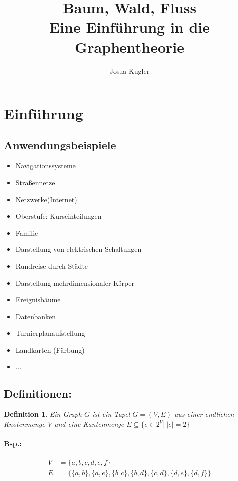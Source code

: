 \documentclass[12pt]{article}
\title{Baum, Wald, Fluss\\
	Eine Einführung in die Graphentheorie}
\author{Josua Kugler}
\numberwithin{equation}{subsection}
\newtheorem{df}{Definition}
\begin{document}
	\maketitle
	\tableofcontents
	\pagebreak
	\section{Einführung}
	\subsection{Anwendungsbeispiele}
	\begin{itemize}
		\item Navigationssysteme
		\item Straßennetze
		\item Netzwerke(Internet)
		\item Oberstufe: Kurseinteilungen
		\item Familie
		\item Darstellung von elektrischen Schaltungen
		\item Rundreise durch Städte
		\item Darstellung mehrdimensionaler Körper
		\item Ereignisbäume
		\item Datenbanken
		\item Turnierplanaufstellung
		\item Landkarten (Färbung)
		\item ...
	\end{itemize}
	\subsection{Definitionen:} 
	\begin{df}
		Ein \textit{Graph} $G$ ist ein Tupel $G=(V,E)$ aus einer endlichen Knotenmenge $V$ und eine Kantenmenge $E\subseteq \{ e\in 2^V|\ |e|=2\}$
	\end{df}
	\paragraph{Bsp.:}
	\begin{align*}
		V&=\{a,b,c,d,e,f\}\\
		E&=\{\{a,b\},\{a,e\},\{b,c\},\{b,d\},\{c,d\},\{d,e\},\{d,f\}\}
	\end{align*}
\end{document}
